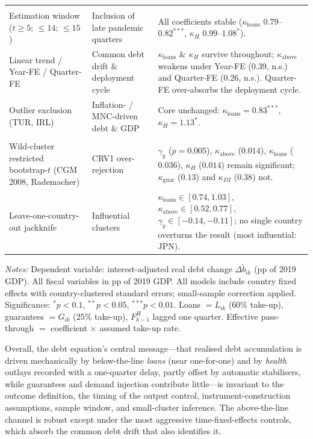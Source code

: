 \begin{table}[htbp]
\begin{tabular}{@{}p{} p{} p{}@{}}
\addlinespace
\multicolumn{3}{@{}l}{\textit{D.\ Time effects \& sample composition}}\\
Estimation window ($t\!\ge\!5$; $\le\!14$; $\le\!15$) & Inclusion of late pandemic quarters & All coefficients stable ($\kappa_{\text{loans}}$ $0.79$--$0.82^{***}$, $\kappa_{H}$ $0.99$--$1.08^{*}$). \\
Linear trend / Year-FE / Quarter-FE & Common debt drift \& deployment cycle & $\kappa_{\text{loans}}$ \& $\kappa_{H}$ survive throughout; $\kappa_{\text{above}}$ weakens under Year-FE ($0.39$, n.s.) and Quarter-FE ($0.26$, n.s.). Quarter-FE over-absorbs the deployment cycle. \\
Outlier exclusion (TUR, IRL) & Inflation- / MNC-driven debt \& GDP & Core unchanged: $\kappa_{\text{loans}}=0.83^{***}$, $\kappa_{H}=1.13^{*}$. \\
\addlinespace
\multicolumn{3}{@{}l}{\textit{E.\ Small-cluster inference} ($N_{\text{cl}}=38$)}\\
Wild-cluster restricted bootstrap-$t$ (CGM 2008, Rademacher) & CRV1 over-rejection & $\gamma_y$ ($p=0.005$), $\kappa_{\text{above}}$ ($0.014$), $\kappa_{\text{loans}}$ ($0.036$), $\kappa_{H}$ ($0.014$) remain significant; $\kappa_{\text{guar}}$ ($0.13$) and $\kappa_{DI}$ ($0.38$) not. \\
Leave-one-country-out jackknife & Influential clusters & $\kappa_{\text{loans}}\in[0.74,1.03]$, $\kappa_{\text{above}}\in[0.52,0.77]$, $\gamma_y\in[-0.14,-0.11]$; no single country overturns the result (most influential: JPN). \\
\bottomrule
\end{tabular}
\vspace{4pt}
\parbox{\textwidth}{\scriptsize\textit{Notes:} Dependent variable: interest-adjusted real debt change $\Delta\tilde b_{ik}$
(pp of 2019 GDP). All fiscal variables in pp of 2019 GDP. All models include country fixed effects with
country-clustered standard errors; small-sample correction applied. Significance: $^{*}p<0.1$, $^{**}p<0.05$,
$^{***}p<0.01$. Loans $=L_{ik}$ (60\% take-up), guarantees $=G_{ik}$ (25\% take-up), $F^H_{k-1}$ lagged one
quarter. Effective pass-through $=$ coefficient $\times$ assumed take-up rate.}
\end{table}

Overall, the debt equation's central message---that realised debt accumulation
is driven mechanically by below-the-line \emph{loans} (near one-for-one) and by
\emph{health} outlays recorded with a one-quarter delay, partly offset by
automatic stabilisers, while guarantees and demand injection contribute
little---is invariant to the outcome definition, the timing of the output
control, instrument-construction assumptions, sample window, and small-cluster
inference. The above-the-line channel is robust except under the most
aggressive time-fixed-effects controls, which absorb the common debt drift that
also identifies it.
